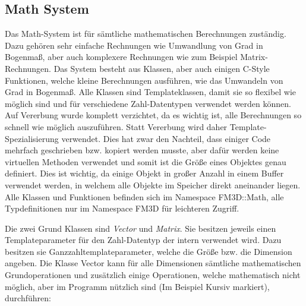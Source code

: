 \subsection{Math System}

Das Math-System ist für sämtliche mathematischen Berechnungen zuständig. Dazu gehören sehr einfache Rechnungen wie Umwandlung von Grad in Bogenmaß, aber auch komplexere Rechnungen wie zum Beispiel Matrix-Rechnungen. 
Das System besteht aus Klassen, aber auch einigen C-Style Funktionen, welche kleine Berechnungen ausführen, wie das Umwandeln von Grad in Bogenmaß. Alle Klassen sind Templateklassen, damit sie so flexibel wie möglich sind und für verschiedene Zahl-Datentypen verwendet werden können. Auf Vererbung wurde komplett verzichtet, da es wichtig ist, alle Berechnungen so schnell wie möglich auszuführen. Statt Vererbung wird daher Template-Spezialisierung verwendet. Dies hat zwar den Nachteil, dass einiger Code mehrfach geschrieben bzw. kopiert werden musste, aber dafür werden keine virtuellen Methoden verwendet und somit ist die Größe eines Objektes genau definiert. 
Dies ist wichtig, da einige Objekt in großer Anzahl in einem Buffer verwendet werden, in welchem alle Objekte im Speicher direkt aneinander liegen. Alle Klassen und Funktionen befinden sich im Namespace FM3D::Math, alle Typdefinitionen nur im Namespace FM3D für leichteren Zugriff.

Die zwei Grund Klassen sind \textit{Vector} und \textit{Matrix}. Sie besitzen jeweils einen Templateparameter für den Zahl-Datentyp der intern verwendet wird. Dazu besitzen sie Ganzzahltemplateparameter, welche die Größe bzw. die Dimension angeben. Die Klasse Vector kann für alle Dimensionen sämtliche mathematischen Grundoperationen und zusätzlich einige Operationen, welche mathematisch nicht möglich, aber im Programm nützlich sind (Im Beispiel Kursiv markiert), durchführen:

